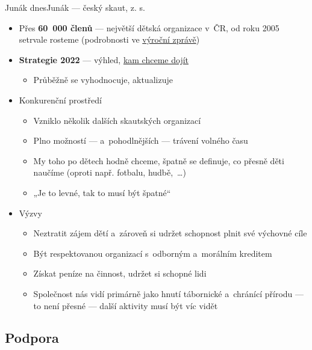\documentclass[compress, ucs, xelatex, xcolor=dvipsnames, print,
  hyperref={
    bookmarks=true,
    unicode=true,
    colorlinks=true,
    plainpages=false,
    pdfkeywords={Junak, Pedagogika, Skaut, Skauting, Vychovna metoda},
    linkcolor=Black,
    anchorcolor=Black,
    citecolor=OliveGreen,
    filecolor=OliveGreen,
    menucolor=Black,
    urlcolor=OliveGreen,
    pdftex}
  ]{beamer}
\begin{document}
\begin{frame}{Junák dnes}{Junák --- český skaut, z. s.}
  \begin{itemize}
    \item Přes \textbf{60~000 členů} --- největší dětská organizace v~ČR, od roku 2005 setrvale rosteme (podrobnosti ve \href{https://www.skaut.cz/skauting/o-skautingu}{výroční zprávě})
    \item \textbf{Strategie 2022} --- výhled, \href{https://strategie.skauting.cz/}{kam chceme dojít}
    \begin{itemize}
      \item Průběžně se vyhodnocuje, aktualizuje
    \end{itemize}
    \item Konkurenční prostředí
    \begin{itemize}
      \item Vzniklo několik dalších skautských organizací
      \item Plno možností --- a~pohodlnějších --- trávení volného času
      \item My toho po dětech hodně chceme, špatně se definuje, co přesně děti naučíme (oproti např. fotbalu, hudbě,~\ldots)
      \item „Je to levné, tak to musí být špatné“
    \end{itemize}
    \item Výzvy
    \begin{itemize}
      \item Neztratit zájem dětí a~zároveň si udržet schopnost plnit své výchovné cíle
      \item Být respektovanou organizací s~odborným a~morálním kreditem
      \item Získat peníze na činnost, udržet si schopné lidi
      \item Společnost nás vidí primárně jako hnutí tábornické a~chránící přírodu --- to není přesné --- další aktivity musí být víc vidět
    \end{itemize}
  \end{itemize}
\end{frame}

\subsection{Podpora}
\end{document}
